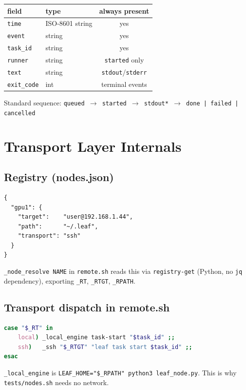 \documentclass[11pt,a4paper]{article}
\begin{document}
\begin{tabular}{@{}llc@{}}
\toprule
field & type & always present \\
\midrule
\texttt{time}      & ISO-8601 string & yes \\
\texttt{event}     & string          & yes \\
\texttt{task\_id}  & string          & yes \\
\texttt{runner}    & string          & \texttt{started} only \\
\texttt{text}      & string          & \texttt{stdout}/\texttt{stderr} \\
\texttt{exit\_code}& int             & terminal events \\
\bottomrule
\end{tabular}

\medskip
Standard sequence:
\texttt{queued \(\to\) started \(\to\) stdout* \(\to\) done\,|\,failed\,|\,cancelled}

\section{Transport Layer Internals}

\subsection{Registry (nodes.json)}

\begin{lstlisting}[language={}]
{
  "gpu1": {
	"target":    "user@192.168.1.44",
	"path":      "~/.leaf",
	"transport": "ssh"
  }
}
\end{lstlisting}

\texttt{\_node\_resolve NAME} in \texttt{remote.sh} reads this via
\texttt{registry-get} (Python, no \texttt{jq} dependency), exporting
\texttt{\_RT}, \texttt{\_RTGT}, \texttt{\_RPATH}.

\subsection{Transport dispatch in remote.sh}

\begin{lstlisting}[language=bash]
case "$_RT" in
	local) _local_engine task-start "$task_id" ;;
	ssh)   _ssh "$_RTGT" "leaf task start $task_id" ;;
esac
\end{lstlisting}

\texttt{\_local\_engine} is \texttt{LEAF\_HOME="\$\_RPATH" python3 leaf\_node.py}.
This is why \texttt{tests/nodes.sh} needs no network.
\end{document}
